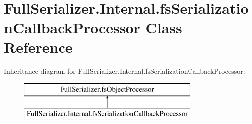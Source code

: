 \hypertarget{class_full_serializer_1_1_internal_1_1fs_serialization_callback_processor}{}\section{Full\+Serializer.\+Internal.\+fs\+Serialization\+Callback\+Processor Class Reference}
\label{class_full_serializer_1_1_internal_1_1fs_serialization_callback_processor}
Inheritance diagram for Full\+Serializer.\+Internal.\+fs\+Serialization\+Callback\+Processor\+:\begin{figure}[H]
\begin{center}
\leavevmode
\includegraphics[height=2.000000cm]{class_full_serializer_1_1_internal_1_1fs_serialization_callback_processor}
\end{center}
\end{figure}
